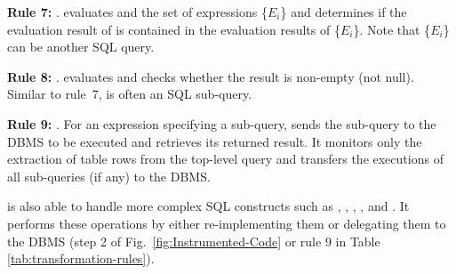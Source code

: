\textbf{Rule 7:} .
\tool{} evaluates  and the set of expressions \{$E_i$\}
and determines if the evaluation result of  is contained
in the evaluation results of \{$E_i$\}. Note that \{$E_i$\} can be
another SQL  query.

\textbf{Rule 8:} . \tool{} evaluates 
and checks whether the result is non-empty (not null). Similar to
rule~7,  is often an SQL sub-query.


\textbf{Rule 9:} . For an expression specifying
a sub-query, \tool{} sends the sub-query to the DBMS to be
executed and retrieves its returned result. It monitors only the
extraction of table rows from the top-level query and transfers the
executions of all sub-queries (if any) to the DBMS.


\tool{} is also able to handle more complex SQL
constructs such as , , ,
, and . It performs these operations by
either re-implementing them or delegating them to the DBMS (step 2 of
Fig.~\ref{fig:Instrumented-Code} or rule 9 in Table
\ref{tab:transformation-rules}).

